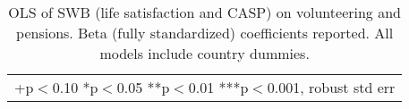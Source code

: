 \documentclass[10pt, letterpaper]{article}
\begin{document}
\begin{spacing}{1.4}


\begin{spacing}{.9}
\begin{table}[H]\centering \caption{OLS of SWB (life satisfaction and CASP) on
    volunteering and pensions. Beta (fully standardized) coefficients reported. All models
    include country dummies.}  \begin{scriptsize} \begin{tabular}{p{1.8in}p{.5in}p{.5in}|p{.5in}p{.5in}}\hline 
      \hline\multicolumn{5}{l}{+p$<$0.10 *p$<$0.05 **p$<$0.01 ***p$<$0.001,
        robust std err} \end{tabular}\label{regCw6} \end{scriptsize}\end{table}
\end{spacing}




\end{spacing}
\end{document}
